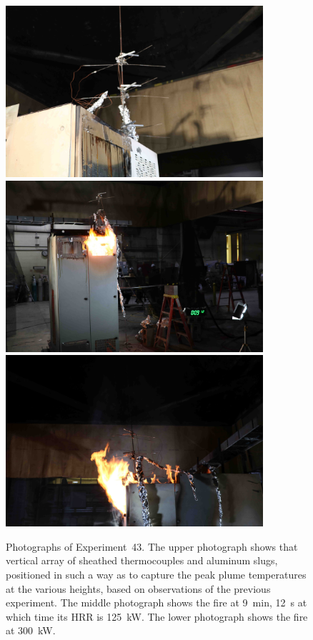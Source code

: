 \begin{figure}[p]
\centering
\includegraphics[height=2.50in]{../FIGURES/Test_43_setup} \\
\includegraphics[height=2.50in]{../FIGURES/Test_43_9_min_12_s} \\
\includegraphics[height=2.50in]{../FIGURES/Test_43_side}
\caption[Photographs of Experiment~43]{Photographs of Experiment~43. The upper photograph shows that vertical array of sheathed thermocouples and aluminum slugs, positioned in such a way as to capture the peak plume temperatures at the various heights, based on observations of the previous experiment. The middle photograph shows the fire at 9~min, 12~s at which time its HRR is 125~kW. The lower photograph shows the fire at 300~kW.}
\label{fig:Test_43_photos}
\end{figure}


